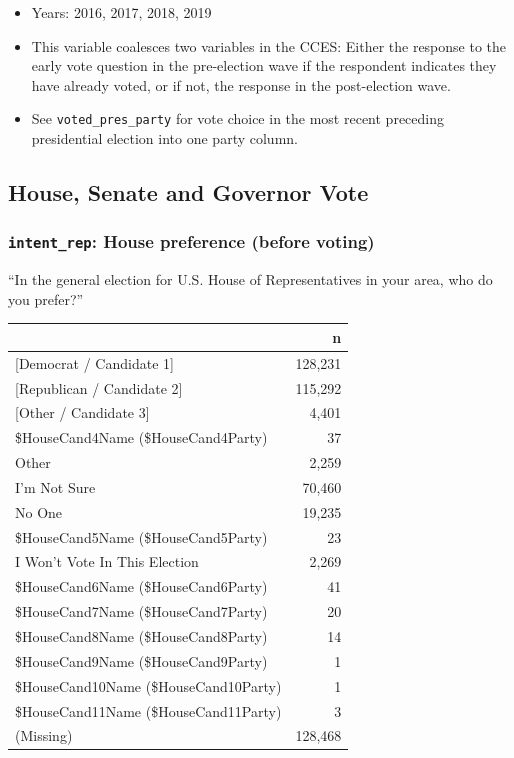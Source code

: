 \documentclass[10pt,article,oneside]{memoir}
\theoremstyle{definition}
\begin{document}
\begin{itemize}
\tightlist
\item
  Years: 2016, 2017, 2018, 2019
\item
  This variable coalesces two variables in the CCES: Either the response
  to the early vote question in the pre-election wave if the respondent
  indicates they have already voted, or if not, the response in the
  post-election wave.
\item
  See \texttt{voted\_pres\_party} for vote choice in the most recent
  preceding presidential election into one party column.
\end{itemize}

\hypertarget{house-senate-and-governor-vote}{%
\subsection{House, Senate and Governor
Vote}\label{house-senate-and-governor-vote}}

\hypertarget{intent_rep-house-preference-before-voting}{%
\subsubsection{\texorpdfstring{\texttt{intent\_rep}: House preference
(before
voting)}{intent\_rep: House preference (before voting)}}\label{intent_rep-house-preference-before-voting}}

``In the general election for U.S. House of Representatives in your
area, who do you prefer?''

\begin{table}[H]
\centering
\begin{tabular}{lr}
\toprule
 & n\\
\midrule
{[Democrat / Candidate 1]} & 128,231\\
{[Republican / Candidate 2]} & 115,292\\
{[Other / Candidate 3]} & 4,401\\
\$HouseCand4Name (\$HouseCand4Party) & 37\\
Other & 2,259\\
I'm Not Sure & 70,460\\
No One & 19,235\\
\$HouseCand5Name (\$HouseCand5Party) & 23\\
I Won't Vote In This Election & 2,269\\
\$HouseCand6Name (\$HouseCand6Party) & 41\\
\$HouseCand7Name (\$HouseCand7Party) & 20\\
\$HouseCand8Name (\$HouseCand8Party) & 14\\
\$HouseCand9Name (\$HouseCand9Party) & 1\\
\$HouseCand10Name (\$HouseCand10Party) & 1\\
\$HouseCand11Name (\$HouseCand11Party) & 3\\
(Missing) & 128,468\\
\bottomrule
\end{tabular}
\end{table}
\end{document}
